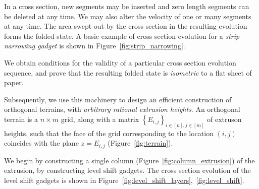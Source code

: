 In a cross section, new segments may be inserted and zero length segments can be deleted at any time.
We may also alter the velocity of one or many segments at any time.
The area swept out by the cross section in the resulting evolution forms the folded state.
A basic example of cross section evolution for a \emph{strip narrowing gadget} is shown in Figure~\ref{fig:strip_narrowing}.

\begin{figure}
    \vspace{-3.0em}
    \vspace{-0.7em}
    \graphicspath{{../figures/}}
    \def\svgwidth{0.3\textwidth}
    \vspace{-5.8em}
\end{figure}
We obtain conditions for the validity of a particular cross section evolution sequence,
and prove that the resulting folded state is \emph{isometric} to a flat sheet of paper.

Subsequently, we use this machinery to design an efficient construction of orthogonal terrains, with \emph{arbitrary rational extrusion heights}.
An orthogonal terrain is a $n\times m$ grid, along with a matrix $\left\{ E_{i,j}\right\}_{i\in [n], j\in[m]}$ of extruson heights,
such that the face of the grid corresponding to the location $(i,j)$ coincides with the plane $z = E_{i,j}$ (Figure~\ref{fig:terrain}).

We begin by constructing a single column (Figure~\ref{fig:column_extrusion}) of the extrusion, by constructing level shift gadgets.
The cross section evolution of the level shift gadgets is shown in Figure~\ref{fig:level_shift_layers},~\ref{fig:level_shift}.

